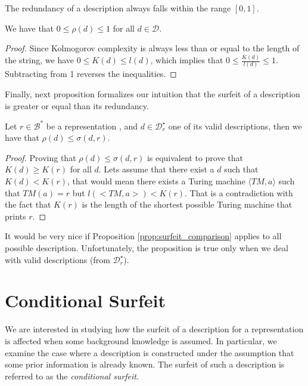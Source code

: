 The redundancy of a description always falls within the range $[0, 1]$.

\begin{proposition}
\label{prop:range_surfeit}
We have that $0 \leq \rho(d) \leq 1$ for all $d \in \mathcal{D}$.
\end{proposition}
\begin{proof}
Since Kolmogorov complexity is always less than or equal to the length of the string, we have $0 \leq K(d) \leq l(d)$, 
which implies that $0 \leq \frac{K(d)}{l(d)} \leq 1$. Subtracting from 1 reverses the inequalities.
\end{proof}

Finally, next proposition formalizes our intuition that the surfeit of a description is greater or equal than its redundancy.

\begin{proposition}
\label{prop:surfeit_comparison}
Let $r \in \mathcal{B}^\ast$ be a representation , and $d \in \mathcal{D}^\star_r$ one of its valid descriptions, then we have that $\rho(d) \leq \sigma(d, r)$.
\end{proposition}
\begin{proof}
Proving that $\rho(d) \leq \sigma(d, r)$ is equivalent to prove that $K(d) \geq K(r)$ for all $d$. Lets assume that there exist a $d$ such that $K(d) < K(r)$, that would mean there exists a Turing machine $\langle TM, a \rangle$ such that $TM(a)=r$ but $l(<TM, a>) < K(r)$. That is a contradiction with the fact that $K(r)$ is the length of the shortest possible Turing machine that prints $r$.
\end{proof}

It would be very nice if Proposition \ref{prop:surfeit_comparison} applies to all possible description. Unfortunately, the proposition is true only when we deal with valid descriptions (from $\mathcal{D}^\star_r$).

%
%

\section{Conditional Surfeit}

We are interested in studying how the surfeit of a description for a representation is affected when some background knowledge is assumed. In particular, we examine the case where a description is constructed under the assumption that some prior information is already known. The surfeit of such a description is referred to as the \emph{conditional surfeit}.

